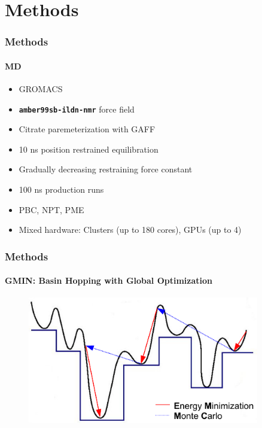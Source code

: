 \documentclass[english]{beamer}
\begin{document}

\section{Methods}

\begin{frame}
    \frametitle{Methods}
    \framesubtitle{MD} 

    \begin{itemize}
        \item GROMACS
        \item \textbf{\texttt{amber99sb-ildn-nmr}} force field
        \item Citrate paremeterization with GAFF
        \item 10 ns position restrained equilibration
        \item Gradually decreasing restraining force constant
        \item 100 ns production runs
        \item PBC, NPT, PME
        \item Mixed hardware: Clusters (up to 180 cores), GPUs (up to 4)
    \end{itemize}

\end{frame}    


\begin{frame}
    \frametitle{Methods}
    \framesubtitle{GMIN: Basin Hopping with Global Optimization}

    \begin{figure}
        \includegraphics[width=0.9\textwidth]{figures/GMIN/GMIN.pdf}
    \end{figure}        

\end{frame}    
\end{document}
